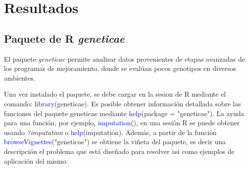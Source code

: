 \chapter{Resultados}

\section{Paquete de R \emph{geneticae}}

El paquete \emph{geneticae} permite analizar datos provenientes de etapas avanzadas de los programas de mejoramiento, donde se evalúan pocos genotipos en diversos ambientes. 

Una vez instalado el paquete, se debe cargar en la sesion de R mediante el comando: \textcolor{blue}{library}(geneticae). Es posible obtener información detallada sobre las funciones del paquete geneticae mediante \textcolor{blue}{help}(package = "geneticae"). La ayuda para una función, por ejemplo, \textcolor{blue}{imputation}(), en una sesión R se puede obtener usando \emph{?imputation} o \textcolor{blue}{help}(imputation). Además, a partir de la función \textcolor{blue}{browseVignettes}("geneticae") se obtiene la viñeta del paquete, es decir una descripción el problema que está diseñado para resolver asi como ejemplos de aplicación del mismo.


